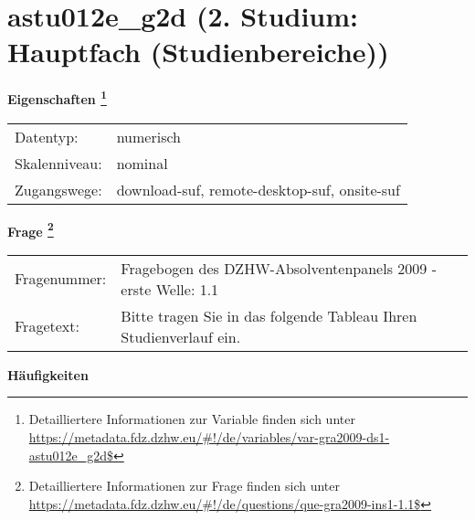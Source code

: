 
    \setcounter{footnote}{0}

    \vspace*{-1.8cm}
	\section{astu012e\_g2d (2. Studium: Hauptfach (Studienbereiche))}
	\label{section:astu012e_g2d}



    \vspace*{0.5cm}
    \noindent\textbf{Eigenschaften
	\footnote{Detailliertere Informationen zur Variable finden sich unter
		\url{https://metadata.fdz.dzhw.eu/\#!/de/variables/var-gra2009-ds1-astu012e_g2d$}}}\\
	\begin{tabularx}{\hsize}{@{}lX}
	Datentyp: & numerisch \\
	Skalenniveau: & nominal \\
	Zugangswege: &
	  download-suf, 
	  remote-desktop-suf, 
	  onsite-suf
 \\
    \end{tabularx}



				\vspace*{0.5cm}
                \noindent\textbf{Frage
	                \footnote{Detailliertere Informationen zur Frage finden sich unter
		              \url{https://metadata.fdz.dzhw.eu/\#!/de/questions/que-gra2009-ins1-1.1$}}}\\
				\begin{tabularx}{\hsize}{@{}lX}
					Fragenummer: &
					  Fragebogen des DZHW-Absolventenpanels 2009 - erste Welle:
					  1.1
 \\
					Fragetext: & Bitte tragen Sie in das folgende Tableau Ihren Studienverlauf ein. \\
				\end{tabularx}





        		\vspace*{0.5cm}
                \noindent\textbf{Häufigkeiten}

